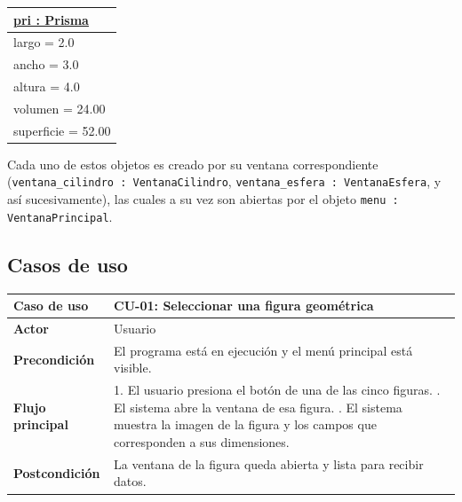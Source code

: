\documentclass[11pt, a4paper]{article}
\newcommand{\objetobox}[2]{%
\begin{center}
\begin{tabular}{|l|}
\hline
\underline{\textbf{#1}} \\
\hline
#2
\hline
\end{tabular}
\end{center}
}
\begin{document}
\objetobox{pri : Prisma}
{%
largo = 2.0 \\
ancho = 3.0 \\
altura = 4.0 \\
volumen = 24.00 \\
superficie = 52.00 \\
}

\noindent Cada uno de estos objetos es creado por su ventana correspondiente
(\texttt{ventana\_cilindro : VentanaCilindro}, \texttt{ventana\_esfera : VentanaEsfera}, y así
sucesivamente), las cuales a su vez son abiertas por el objeto
\texttt{menu : VentanaPrincipal}.

\newpage
\subsection{Casos de uso}
\begin{table}[H]
\centering
\begin{tabularx}{\textwidth}{@{}l X@{}}
\toprule
\textbf{Caso de uso} & CU-01: Seleccionar una figura geométrica \\
\midrule
\textbf{Actor} & Usuario \\
\textbf{Precondición} & El programa está en ejecución y el menú principal está visible. \\
\textbf{Flujo principal} & 1. El usuario presiona el botón de una de las cinco figuras. \newline
                           2. El sistema abre la ventana de esa figura. \newline
                           3. El sistema muestra la imagen de la figura y los campos que
                              corresponden a sus dimensiones. \\
\textbf{Postcondición} & La ventana de la figura queda abierta y lista para recibir datos. \\
\bottomrule
\end{tabularx}
\end{table}
\end{document}
